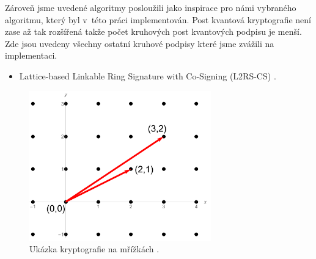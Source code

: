 \hfill

Zároveň jsme uvedené algoritmy posloužili jako inspirace pro námi vybraného algoritmu, který byl v~této práci implementován. Post kvantová kryptografie není zase až tak rozšířená takže počet kruhových post kvantových podpisu je menší. Zde jsou uvedeny všechny ostatní kruhové podpisy které jsme zvážili na implementaci.

\begin{itemize}
  \item Lattice-based Linkable Ring Signature with Co-Signing (L2RS-CS) \cite{Torres2020}.
\end{itemize}


\begin{figure}[htbp]
  \centering
  \includegraphics[width=0.7\textwidth]{img/mrizky.png}
  \caption{Ukázka kryptografie na mřížkách \cite{Mrizky picture}.}
  \label{lattice}
  \label{Ring signature}
\end{figure}
